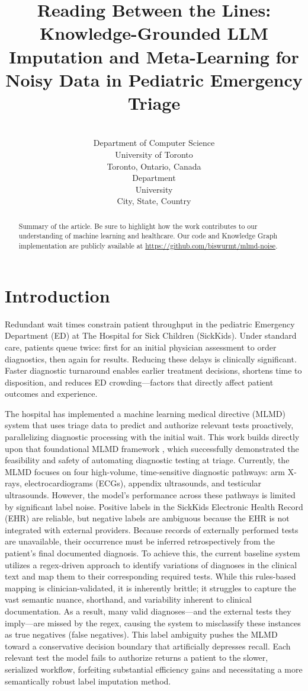 \documentclass[pmlr]{jmlr}%
\title[Decoding Triage]{Reading Between the Lines: Knowledge-Grounded LLM Imputation and Meta-Learning for Noisy Data in Pediatric Emergency Triage}
\author{\Name{Alice Chua}
       \Email{alice.chua@mail.utoronto.ca}\\
       \addr Department of Computer Science\\
       University of Toronto\\
       Toronto, Ontario, Canada
       \AND
       \Name{Firstname Lastname}
       \Email{name@email.edu}\\
       \addr Department\\
       University\\
       City, State, Country}
\begin{document}
\maketitle

\begin{abstract}
  Summary of the article.  Be sure to highlight how the work
  contributes to our understanding of machine learning and healthcare.
  Our code and Knowledge Graph implementation are publicly available at \url{https://github.com/biswurmt/mlmd-noise}.
\end{abstract}

\section{Introduction}

Redundant wait times constrain patient throughput in the pediatric Emergency Department (ED) at The Hospital for Sick Children (SickKids). Under standard care, patients queue twice: first for an initial physician assessment to order diagnostics, then again for results. Reducing these delays is clinically significant. Faster diagnostic turnaround enables earlier treatment decisions, shortens time to disposition, and reduces ED crowding—factors that directly affect patient outcomes and experience.

The hospital has implemented a machine learning medical directive (MLMD) system that uses triage data to predict and authorize relevant tests proactively, parallelizing diagnostic processing with the initial wait. This work builds directly upon that foundational MLMD framework \cite{singh2022assessment}, which successfully demonstrated the feasibility and safety of automating diagnostic testing at triage. Currently, the MLMD focuses on four high-volume, time-sensitive diagnostic pathways: arm X-rays, electrocardiograms (ECGs), appendix ultrasounds, and testicular ultrasounds. However, the model's performance across these pathways is limited by significant label noise. Positive labels in the SickKids Electronic Health Record (EHR) are reliable, but negative labels are ambiguous because the EHR is not integrated with external providers. Because records of externally performed tests are unavailable, their occurrence must be inferred retrospectively from the patient's final documented diagnosis. To achieve this, the current baseline system utilizes a regex-driven approach to identify variations of diagnoses in the clinical text and map them to their corresponding required tests. While this rules-based mapping is clinician-validated, it is inherently brittle; it struggles to capture the vast semantic nuance, shorthand, and variability inherent to clinical documentation. As a result, many valid diagnoses—and the external tests they imply—are missed by the regex, causing the system to misclassify these instances as true negatives (false negatives). This label ambiguity pushes the MLMD toward a conservative decision boundary that artificially depresses recall. Each relevant test the model fails to authorize returns a patient to the slower, serialized workflow, forfeiting substantial efficiency gains and necessitating a more semantically robust label imputation method.
\end{document}
